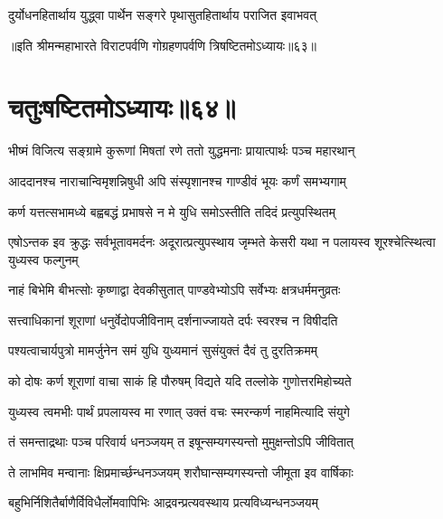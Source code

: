 \twolineshloka
{दुर्योधनहितार्थाय युद्ध्वा पार्थेन सङ्गरे}
{पृथासुतहितार्थाय पराजित इवाभवत्}

॥इति श्रीमन्महाभारते विराटपर्वणि गोग्रहणपर्वणि त्रिषष्टितमोऽध्यायः॥६३॥

\chapter{चतुःषष्टितमोऽध्यायः॥६४॥}

\twolineshloka
{भीष्मं विजित्य सङ्ग्रामे कुरूणां मिषतां रणे}
{ततो युद्धमनाः प्रायात्पार्थः पञ्च महारथान्}


\twolineshloka
{आददानश्च नाराचान्विमृशन्निषुधी अपि}
{संस्पृशानश्च गाण्डीवं भूयः कर्णं समभ्यगाम्}




\twolineshloka
{कर्ण यत्तत्सभामध्ये बह्वबद्धं प्रभाषसे}
{न मे युधि समोऽस्तीति तदिदं प्रत्युपस्थितम्}


\threelineshloka
{एषोऽन्तक इव क्रुद्धः सर्वभूतावमर्दनः}
{अदूरात्प्रत्युपस्थाय जृम्भते केसरी यथा}
{न पलायस्व शूरश्चेत्स्थित्वा युध्यस्व फल्गुनम्}




\twolineshloka
{नाहं बिभेमि बीभत्सोः कृष्णाद्वा देवकीसुतात्}
{पाण्डवेभ्योऽपि सर्वेभ्यः क्षत्रधर्ममनुव्रतः}


\twolineshloka
{सत्त्वाधिकानां शूराणां धनुर्वेदोपजीविनाम्}
{दर्शनाज्जायते दर्पः स्वरश्च न विषीदति}


\twolineshloka
{पश्यत्वाचार्यपुत्रो मामर्जुनेन समं युधि}
{युध्यमानं सुसंयुक्तं दैवं तु दुरतिक्रमम्}




\twolineshloka
{को दोषः कर्ण शूराणां वाचा साकं हि पौरुषम्}
{विद्यते यदि तल्लोके गुणोत्तरमिहोच्यते}


\twolineshloka
{युध्यस्व त्वमभीः पार्थं प्रपलायस्व मा रणात्}
{उक्तं वचः स्मरन्कर्ण नाहमित्यादि संयुगे}



\twolineshloka
{तं समन्ताद्रथाः पञ्च परिवार्य धनञ्जयम्}
{त इषून्सम्यगस्यन्तो मुमुक्षन्तोऽपि जीवितात्}


\twolineshloka
{ते लाभमिव मन्वानाः क्षिप्रमार्च्छन्धनञ्जयम्}
{शरौघान्सम्यगस्यन्तो जीमूता इव वार्षिकाः}


\twolineshloka
{बहुभिर्निशितैर्बाणैर्विविधैर्लोमवापिभिः}
{आद्रवन्प्रत्यवस्थाय प्रत्यविध्यन्धनञ्जयम्}



